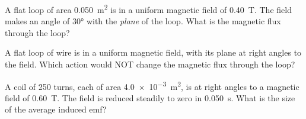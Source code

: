 
\begin{quizq}{}
A flat loop of area \qty{0.050}{m^2} is in a uniform magnetic field of \qty{0.40}{T}. The field makes an
angle of \ang{30} with the \emph{plane} of the loop. What is the magnetic flux through the loop?
\end{quizq}

\begin{quizq}{}
A flat loop of wire is in a uniform magnetic field, with its plane at right angles to the field. Which
action would NOT change the magnetic flux through the loop?
\end{quizq}

\begin{quizq}{}
A coil of 250 turns, each of area \qty{4.0e-3}{m^2}, is at right angles to a magnetic field of
\qty{0.60}{T}. The field is reduced steadily to zero in \qty{0.050}{s}. What is the size of the average
induced emf?
\end{quizq}

